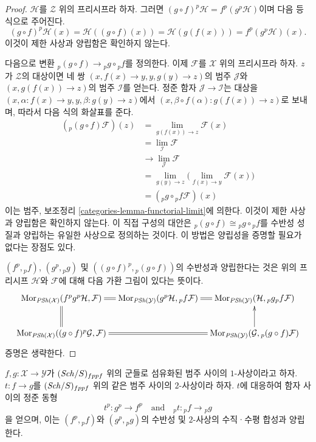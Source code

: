 \begin{proof}
$\mathcal{H}$를 $\mathcal{Z}$ 위의 프리시프라 하자. 그러면
$(g \circ f)^p\mathcal{H} = f^p (g^p\mathcal{H})$이며 다음 등식으로
주어진다.
$$
(g \circ f)^p\mathcal{H}(x) = \mathcal{H}((g \circ f)(x))
= \mathcal{H}(g(f(x))) = f^p (g^p\mathcal{H})(x).
$$
이것이 제한 사상과 양립함은 확인하지 않는다.

\medskip\noindent
다음으로 변환 ${}_p(g \circ f) \to {}_pg \circ {}_pf$를 정의한다.
이제 $\mathcal{F}$를 $\mathcal{X}$ 위의 프리시프라 하자.
$z$가 $\mathcal{Z}$의 대상이면 네 쌍
$(x, f(x) \to y, y, g(y) \to z)$의 범주 $\mathcal{J}$와
$(x, g(f(x)) \to z)$의 범주 $\mathcal{I}$를 얻는다. 정준 함자
$\mathcal{J} \to \mathcal{I}$는 대상을
$(x, \alpha : f(x) \to y, y, \beta : g(y) \to z)$에서
$(x, \beta \circ f(\alpha) : g(f(x)) \to z)$로 보내며,
따라서 다음 식의 화살표를 준다.
\begin{align*}
({}_p(g \circ f)\mathcal{F})(z) & =
\lim_{g(f(x)) \to z} \mathcal{F}(x) \\
& = \lim_\mathcal{I} \mathcal{F} \\
& \to \lim_\mathcal{J} \mathcal{F} \\
& = \lim_{g(y) \to z}
\Big(\lim_{f(x) \to y} \mathcal{F}(x)\Big) \\
& =
({}_pg \circ {}_pf\mathcal{F})(x)
\end{align*}
이는 범주, 보조정리 \ref{categories-lemma-functorial-limit}에 의한다.
이것이 제한 사상과 양립함은 확인하지 않는다. 이 직접 구성의 대안은
${}_p(g \circ f) \cong {}_pg \circ {}_pf$를 수반성 성질과 양립하는 유일한 사상으로
정의하는 것이다. 이 방법은 양립성을 증명할 필요가 없다는 장점도 있다.

\medskip\noindent
$(f^p, {}_pf)$, $(g^p, {}_pg)$ 및
$((g \circ f)^p, {}_p(g \circ f))$의 수반성과 양립한다는 것은 위의
프리시프 $\mathcal{H}$와 $\mathcal{F}$에 대해 다음 가환 그림이 있다는
뜻이다.
$$
\xymatrix@C=0.8em{
\Mor_{\textit{PSh}(\mathcal{X})}(f^pg^p\mathcal{H}, \mathcal{F})
\ar@{=}[r] \ar@{=}[d] &
\Mor_{\textit{PSh}(\mathcal{Y})}(g^p\mathcal{H}, {}_pf\mathcal{F})
\ar@{=}[r] &
\Mor_{\textit{PSh}(\mathcal{Y})}(\mathcal{H}, {}_pg{}_pf\mathcal{F})
\\
\Mor_{\textit{PSh}(\mathcal{X})}((g \circ f)^p\mathcal{G}, \mathcal{F})
\ar@{=}[rr] & &
\Mor_{\textit{PSh}(\mathcal{Y})}(\mathcal{G}, {}_p(g \circ f)\mathcal{F})
\ar[u]
}
$$
증명은 생략한다.
\end{proof}

\begin{lemma}
\label{lemma-2-morphisms-presheaves}
$f, g : \mathcal{X} \to \mathcal{Y}$가 $(\mathit{Sch}/S)_{fppf}$ 위의 군들로
섬유화된 범주 사이의 $1$-사상이라고 하자. $t : f \to g$를
$(\mathit{Sch}/S)_{fppf}$ 위의 같은 범주 사이의 $2$-사상이라 하자.
$t$에 대응하여 함자 사이의 정준
동형
$$
t^p : g^p \longrightarrow f^p
\quad\text{and}\quad
{}_pt : {}_pf \longrightarrow {}_pg
$$
을 얻으며, 이는 $(f^p, {}_pf)$와 $(g^p, {}_pg)$의 수반성 및
$2$-사상의 수직·수평 합성과 양립한다.
\end{lemma}

